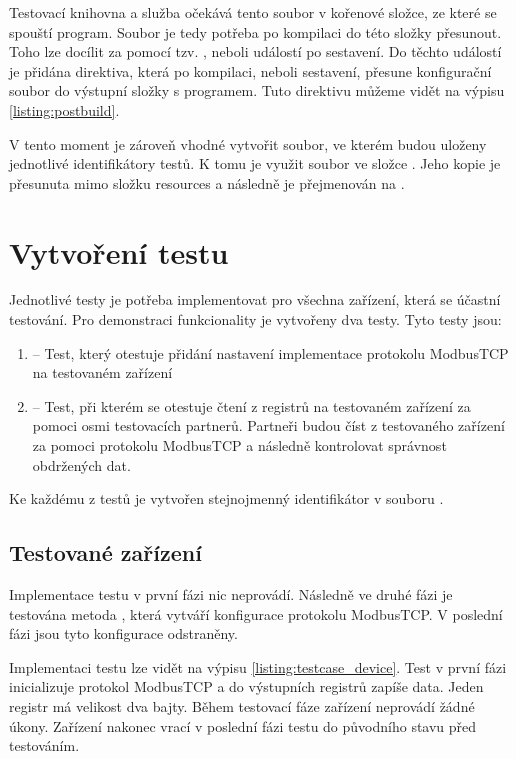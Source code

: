 Testovací knihovna a služba očekává tento soubor v kořenové složce, ze které se spouští program. Soubor je tedy potřeba po kompilaci do této složky přesunout. Toho lze docílit za pomocí tzv. , neboli událostí po sestavení. Do těchto událostí je přidána direktiva, která po kompilaci, neboli sestavení, přesune konfigurační soubor do výstupní složky s programem. Tuto direktivu můžeme vidět na výpisu \ref{listing:postbuild}.

V tento moment je zároveň vhodné vytvořit soubor, ve kterém budou uloženy jednotlivé identifikátory testů. K tomu je využit soubor  ve složce . Jeho kopie je přesunuta mimo složku resources a následně je přejmenován na .

\section{Vytvoření testu}
Jednotlivé testy je potřeba implementovat pro všechna zařízení, která se účastní testování. 
Pro demonstraci funkcionality je vytvořeny dva testy. Tyto testy jsou:
\begin{enumerate}
    \item {} -- Test, který otestuje přidání nastavení implementace protokolu ModbusTCP na testovaném zařízení
    \item {} -- Test, při kterém se otestuje čtení z registrů na testovaném zařízení za pomoci osmi testovacích partnerů. Partneři budou číst z testovaného zařízení za pomoci protokolu ModbusTCP a následně kontrolovat správnost obdržených dat.
\end{enumerate}

Ke každému z testů je vytvořen stejnojmenný identifikátor v souboru .


\subsection{Testované zařízení}

Implementace testu  v první fázi nic neprovádí. Následně ve druhé fázi je testována metoda , která vytváří konfigurace protokolu ModbusTCP. V poslední fázi jsou tyto konfigurace odstraněny.  

Implementaci testu  lze vidět na výpisu \ref{listing:testcase_device}. Test v první fázi inicializuje protokol ModbusTCP a do výstupních registrů zapíše data. Jeden registr má velikost dva bajty. Během testovací fáze zařízení neprovádí žádné úkony. Zařízení nakonec vrací v poslední fázi testu do původního stavu před testováním.

